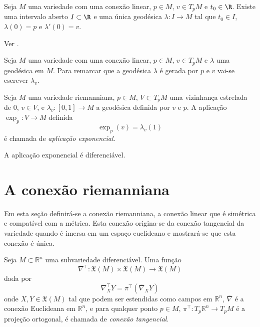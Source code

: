 \begin{teorema}
	Seja $M$ uma variedade com uma conexão linear,
	$p \in M$,
	$v \in T_p M$ e
	$t_0 \in \R$.
	Existe uma intervalo aberto $I \subset \R$ e uma única geodésica $\lambda: I \rightarrow M$ tal que $t_0 \in I$,
	$\lambda(0) = p$ e
	$\lambda'(0) = v$.
\end{teorema}

\begin{demonstracao}
	Ver \cite[Theorem 4.10]{Lee1997}.
\end{demonstracao}

\begin{observacao}
	Seja $M$ uma variedade com uma conexão linear,
	$p \in M$,
	$v \in T_p M$ e
	$\lambda$ uma geodésica em $M$.
	Para remarcar que a geodésica $\lambda$ é gerada por $p$ e $v$ vai-se escrever $\lambda_v$.
\end{observacao}

\begin{definicao}
	Seja $M$ uma variedade riemanniana,
	$p \in M$,
	$V \subset T_p M$ uma vizinhança estrelada de 0,
	$v \in V$, e
	$\lambda_v: [0,1] \rightarrow M$ a geodésica definida por $v$ e $p$.
	A aplicação $\exp_p: V \rightarrow M$ definida
	\begin{equation*}
	\exp_p(v) = \lambda_v(1)
	\end{equation*}
	é chamada de \emph{aplicação exponencial}.
\end{definicao}

\begin{observacao}
	A aplicação exponencial é diferenciável.
\end{observacao}


\section{A conexão riemanniana}

Em esta seção definirá-se a conexão riemanniana, a conexão linear que é simétrica e compatível com a métrica.
Esta conexão origina-se da conexão tangencial da variedade quando é imersa em um espaço euclideano e mostrará-se que esta conexão é única.

\begin{definicao}
	Seja $M \subset \mathbb{R}^n$ uma subvariedade diferenciável. Uma função
	\begin{equation*}
		\nabla^\top: \mathfrak{X}(M) \times \mathfrak{X}(M) \rightarrow \mathfrak{X}(M)
	\end{equation*}
	dada por
	\begin{equation*}
		\nabla^\top_X Y = \pi^\top \left( \overline{\nabla}_X Y \right)
	\end{equation*}
	onde $X,Y \in \mathfrak{X}(M)$ tal que podem ser estendidas como campos em $\mathbb{R}^n$, $\overline{\nabla}$ é a conexão Euclideana em $\mathbb{R}^n$, e para qualquer ponto $p \in M$, $\pi^\top: T_p \mathbb{R}^n \rightarrow T_p M$ é a projeção ortogonal, é chamada de \emph{conexão tangencial}.
\end{definicao}

